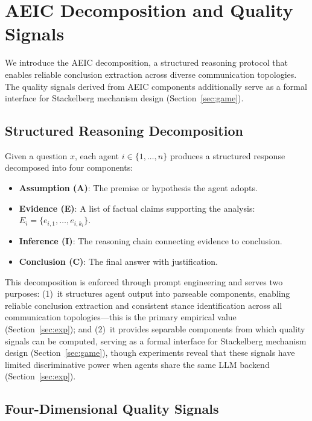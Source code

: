\section{AEIC Decomposition and Quality Signals}
\label{sec:aeic}

We introduce the AEIC decomposition, a structured reasoning protocol that enables reliable conclusion extraction across diverse communication topologies. The quality signals derived from AEIC components additionally serve as a formal interface for Stackelberg mechanism design (Section~\ref{sec:game}).

\subsection{Structured Reasoning Decomposition}

Given a question $x$, each agent $i \in \{1, \ldots, n\}$ produces a structured response decomposed into four components:

\begin{itemize}
    \item \textbf{Assumption (A)}: The premise or hypothesis the agent adopts.
    \item \textbf{Evidence (E)}: A list of factual claims supporting the analysis: $E_i = \{e_{i,1}, \ldots, e_{i,k_i}\}$.
    \item \textbf{Inference (I)}: The reasoning chain connecting evidence to conclusion.
    \item \textbf{Conclusion (C)}: The final answer with justification.
\end{itemize}

This decomposition is enforced through prompt engineering and serves two purposes: (1)~it structures agent output into parseable components, enabling reliable conclusion extraction and consistent stance identification across all communication topologies---this is the primary empirical value (Section~\ref{sec:exp}); and (2)~it provides separable components from which quality signals can be computed, serving as a formal interface for Stackelberg mechanism design (Section~\ref{sec:game}), though experiments reveal that these signals have limited discriminative power when agents share the same LLM backend (Section~\ref{sec:exp}).

\subsection{Four-Dimensional Quality Signals}


